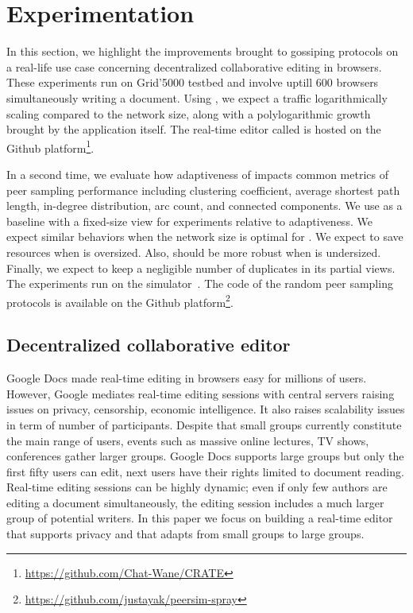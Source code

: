 \section{Experimentation}
\label{sec:experiments}

In this section, we highlight the improvements brought to gossiping protocols on
a real-life use case concerning decentralized collaborative editing in browsers.
These experiments run on Grid'5000 testbed and involve uptill 600 browsers
simultaneously writing a document. Using \SPRAY, we expect a traffic
logarithmically scaling compared to the network size, along with a
polylogarithmic growth brought by the application itself. The real-time editor
called \CRATE is hosted on the Github
platform\footnote{\url{https://github.com/Chat-Wane/CRATE}}.

In a second time, we evaluate how adaptiveness of \SPRAY impacts common metrics
of peer sampling performance including clustering coefficient, average shortest
path length, in-degree distribution, arc count, and connected components. We use
\CYCLON as a baseline with a fixed-size view for experiments relative to
adaptiveness. We expect similar behaviors when the network size is optimal for
\CYCLON. We expect \SPRAY to save resources when \CYCLON is oversized. Also,
\SPRAY should be more robust when \CYCLON is undersized. Finally, we expect
\SPRAY to keep a negligible number of duplicates in its partial views. The
experiments run on the \PEERSIM simulator~\cite{montresor2009peersim}. The code
of the random peer sampling protocols is available on the Github
platform\footnote{\url{https://github.com/justayak/peersim-spray}}.


\subsection{Decentralized collaborative editor}
\label{subsec:editor}

Google Docs made real-time editing in browsers easy for millions of
users. However, Google mediates real-time editing sessions with central servers
raising issues on privacy, censorship, economic intelligence. It also raises
scalability issues in term of number of participants.  Despite that small groups
currently constitute the main range of users, events such as massive online
lectures, TV shows, conferences gather larger groups.  Google Docs supports
large groups but only the first fifty users can edit, next users have their
rights limited to document reading.    Real-time editing sessions can be highly dynamic; even if only
few authors are editing a document simultaneously, the editing session includes
a much larger group of potential writers. In this paper we focus on building a
real-time editor that supports privacy and that adapts  from small
groups to large groups.

